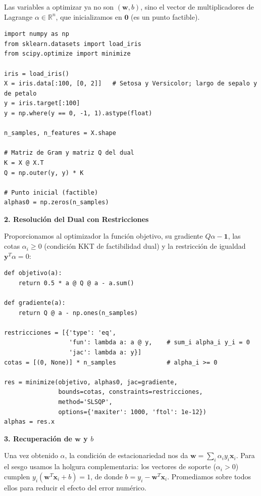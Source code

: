 \documentclass[12pt, a4paper]{article}
\begin{document}
\noindent Las variables a optimizar ya no son $(\mathbf{w}, b)$, sino el vector de multiplicadores de Lagrange $\alpha \in \mathbb{R}^n$, que inicializamos en $\mathbf{0}$ (es un punto factible).

\begin{lstlisting}
import numpy as np
from sklearn.datasets import load_iris
from scipy.optimize import minimize

iris = load_iris()
X = iris.data[:100, [0, 2]]   # Setosa y Versicolor; largo de sepalo y de petalo
y = iris.target[:100]
y = np.where(y == 0, -1, 1).astype(float)

n_samples, n_features = X.shape

# Matriz de Gram y matriz Q del dual
K = X @ X.T
Q = np.outer(y, y) * K

# Punto inicial (factible)
alphas0 = np.zeros(n_samples)
\end{lstlisting}

\vspace{0.2cm}
\noindent \textbf{2. Resolución del Dual con Restricciones}

\noindent Proporcionamos al optimizador la función objetivo, su gradiente $Q\alpha - \mathbf{1}$, las cotas $\alpha_i \geq 0$ (condición KKT de factibilidad dual) y la restricción de igualdad $\mathbf{y}^T\alpha = 0$:

\begin{lstlisting}
def objetivo(a):
    return 0.5 * a @ Q @ a - a.sum()

def gradiente(a):
    return Q @ a - np.ones(n_samples)

restricciones = [{'type': 'eq',
                  'fun': lambda a: a @ y,    # sum_i alpha_i y_i = 0
                  'jac': lambda a: y}]
cotas = [(0, None)] * n_samples              # alpha_i >= 0

res = minimize(objetivo, alphas0, jac=gradiente,
               bounds=cotas, constraints=restricciones,
               method='SLSQP',
               options={'maxiter': 1000, 'ftol': 1e-12})
alphas = res.x
\end{lstlisting}

\vspace{0.2cm}
\noindent \textbf{3. Recuperación de $\mathbf{w}$ y $b$}

\noindent Una vez obtenido $\alpha$, la condición de estacionariedad nos da $\mathbf{w} = \sum_i \alpha_i y_i \mathbf{x}_i$. Para el sesgo usamos la holgura complementaria: los vectores de soporte ($\alpha_i > 0$) cumplen $y_i(\mathbf{w}^T\mathbf{x}_i + b) = 1$, de donde $b = y_i - \mathbf{w}^T\mathbf{x}_i$. Promediamos sobre todos ellos para reducir el efecto del error numérico.
\end{document}
